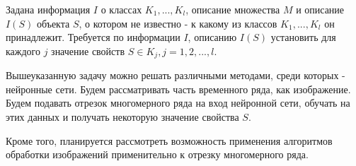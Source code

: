 \documentclass{article}
\begin{document}
\par{
Задана информация $I$ о классах $K_1,...,K_l$, описание множества $M$ и описание $I(S)$ объекта $S$, о котором не известно - к какому из классов $K_1,...,K_l$ он принадлежит. Требуется по информации $I$, описанию $I(S)$ установить для каждого $j$ значение свойств $S \in K_j, j=1,2,...,l$. \cite{zhuravlev78}
}

\par{
Вышеуказанную задачу можно решать различными методами, среди которых - нейронные сети. Будем рассматривать часть временного ряда, как изображение. Будем подавать отрезок многомерного ряда на вход нейронной сети, обучать на этих данных и получать некоторую значение свойства $S$.
}

\par{
Кроме того, планируется рассмотреть возможность применения алгоритмов обработки изображений применительно к отрезку многомерного ряда. 
}

\newpage


\end{document}
